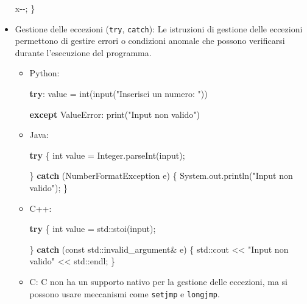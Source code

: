 \documentclass[
  letterpaper,
]{scrbook}
\newenvironment{Shaded}{\begin{snugshade}}{\end{snugshade}}
\newcommand{\AttributeTok}[1]{\textcolor[rgb]{0.40,0.45,0.13}{#1}}
\newcommand{\BuiltInTok}[1]{\textcolor[rgb]{0.00,0.23,0.31}{#1}}
\newcommand{\ControlFlowTok}[1]{\textcolor[rgb]{0.00,0.23,0.31}{\textbf{#1}}}
\newcommand{\DataTypeTok}[1]{\textcolor[rgb]{0.68,0.00,0.00}{#1}}
\newcommand{\FunctionTok}[1]{\textcolor[rgb]{0.28,0.35,0.67}{#1}}
\newcommand{\NormalTok}[1]{\textcolor[rgb]{0.00,0.23,0.31}{#1}}
\newcommand{\OperatorTok}[1]{\textcolor[rgb]{0.37,0.37,0.37}{#1}}
\newcommand{\PreprocessorTok}[1]{\textcolor[rgb]{0.68,0.00,0.00}{#1}}
\newcommand{\StringTok}[1]{\textcolor[rgb]{0.13,0.47,0.30}{#1}}
\begin{document}
\begin{itemize}
\begin{Shaded}
\begin{Highlighting}[]
\NormalTok{  x}\OperatorTok{{-}{-};}
\OperatorTok{\}}
\end{Highlighting}
\end{Shaded}
\item
  Gestione delle eccezioni (\texttt{try}, \texttt{catch}): Le istruzioni
  di gestione delle eccezioni permettono di gestire errori o condizioni
  anomale che possono verificarsi durante l'esecuzione del programma.

  \begin{itemize}
  \item
    Python:

\begin{Shaded}
\begin{Highlighting}[]
\ControlFlowTok{try}\NormalTok{:}
\NormalTok{  value }\OperatorTok{=} \BuiltInTok{int}\NormalTok{(}\BuiltInTok{input}\NormalTok{(}\StringTok{"Inserisci un numero: "}\NormalTok{))}

\ControlFlowTok{except} \PreprocessorTok{ValueError}\NormalTok{:}
  \BuiltInTok{print}\NormalTok{(}\StringTok{"Input non valido"}\NormalTok{)}
\end{Highlighting}
\end{Shaded}
  \item
    Java:

\begin{Shaded}
\begin{Highlighting}[]
\ControlFlowTok{try} \OperatorTok{\{}
  \DataTypeTok{int}\NormalTok{ value }\OperatorTok{=} \BuiltInTok{Integer}\OperatorTok{.}\FunctionTok{parseInt}\OperatorTok{(}\NormalTok{input}\OperatorTok{);}

\OperatorTok{\}} \ControlFlowTok{catch} \OperatorTok{(}\BuiltInTok{NumberFormatException}\NormalTok{ e}\OperatorTok{)} \OperatorTok{\{}
  \BuiltInTok{System}\OperatorTok{.}\FunctionTok{out}\OperatorTok{.}\FunctionTok{println}\OperatorTok{(}\StringTok{"Input non valido"}\OperatorTok{);}
\OperatorTok{\}}
\end{Highlighting}
\end{Shaded}
  \item
    C++:

\begin{Shaded}
\begin{Highlighting}[]
\ControlFlowTok{try} \OperatorTok{\{}
  \DataTypeTok{int}\NormalTok{ value }\OperatorTok{=} \BuiltInTok{std::}\NormalTok{stoi}\OperatorTok{(}\NormalTok{input}\OperatorTok{);}

\OperatorTok{\}} \ControlFlowTok{catch} \OperatorTok{(}\AttributeTok{const} \BuiltInTok{std::}\NormalTok{invalid\_argument}\OperatorTok{\&}\NormalTok{ e}\OperatorTok{)} \OperatorTok{\{}
  \BuiltInTok{std::}\NormalTok{cout }\OperatorTok{\textless{}\textless{}} \StringTok{"Input non valido"} \OperatorTok{\textless{}\textless{}} \BuiltInTok{std::}\NormalTok{endl}\OperatorTok{;}
\OperatorTok{\}}
\end{Highlighting}
\end{Shaded}
  \item
    C: C non ha un supporto nativo per la gestione delle eccezioni, ma
    si possono usare meccanismi come \texttt{setjmp} e \texttt{longjmp}.


\end{itemize}
\end{itemize}
\end{document}
